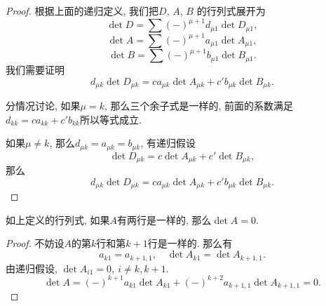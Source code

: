 \begin{proof}
    根据上面的递归定义, 我们把$D$, $A$, $B$ 的行列式展开为
    \begin{equation}
        \det D = \sum \left( - \right) ^{\mu + 1}d_{\mu 1} \det D_{\mu 1},
    \end{equation}
    \begin{equation}
      \det A = \sum \left( - \right) ^{\mu + 1}a_{\mu 1} \det A_{\mu 1},
    \end{equation}
    \begin{equation}
      \det B = \sum \left( - \right) ^{\mu + 1}b_{\mu 1} \det B_{\mu 1}.
    \end{equation}
    我们需要证明
    \begin{equation}
      d_{\mu k} \det D_{\mu k} = c a_{\mu k} \det A_{\mu k} + c' b_{\mu k} \det B_{\mu k}. 
    \end{equation}
    
    分情况讨论, 如果$\mu = k$, 那么三个余子式是一样的, 前面的系数满足$d_{k k} = c a_{k k} + c' b_{k k}$所以等式成立. 
    
    如果$\mu \neq k$, 那么$d_{\mu k} = a_{\mu k} = b_{\mu k}$, 有递归假设
    \begin{equation}
      \det D_{\mu k} = c \det A_{\mu k} + c' \det B_{\mu k},
    \end{equation}
    那么
    \begin{equation}
        d_{\mu k} \det D_{\mu k} = c a_{\mu k} \det A_{\mu k} + c' b_{\mu k} \det B_{\mu k}.
    \end{equation}
\end{proof}

\begin{proposition}
    如上定义的行列式, 如果$A$有两行是一样的, 那么$\det A = 0$.
\end{proposition}

\begin{proof}
    不妨设$A$的第$k$行和第$k+1$行是一样的. 那么有
    \begin{equation}
      a_{k 1} = a_{k+1 ,1}, \quad \det A_{k 1} = \det A_{k+1 ,1}.
    \end{equation}
    由递归假设, $\det A _{i 1} = 0, \ i \neq k, k+1$.
    \begin{equation}
      \det A = \left( - \right) ^{k + 1} a_{k 1} \det A_{k 1} + \left( - \right) ^{k + 2} a_{k+1 ,1} \det A_{k+1 ,1} = 0.
    \end{equation}
\end{proof}

